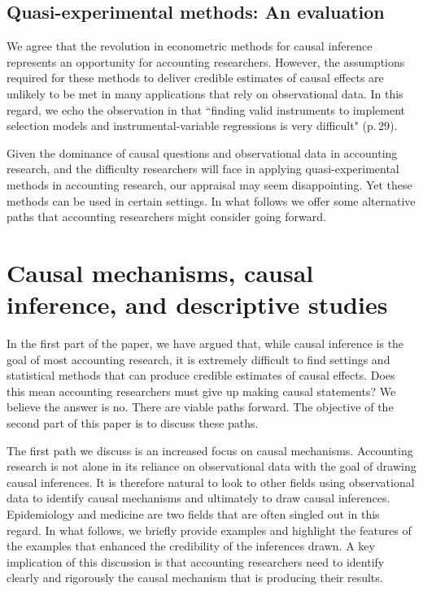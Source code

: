 \documentclass[12pt,reqno,titlepage]{amsart}
\theoremstyle{definition}
\begin{document}
\begin{doublespace}

\subsection{Quasi-experimental methods: An evaluation}
We agree that the revolution in econometric methods for causal inference represents an opportunity for accounting researchers.
However, the assumptions required for these methods to deliver credible estimates of causal effects are unlikely to be met in many applications that rely on observational data. 
In this regard, we echo the observation in \citet{Leuz:2015aa} that ``finding valid instruments to implement selection models and instrumental-variable regressions is very difficult" (p.\,29). 

Given the dominance of causal questions and observational data in accounting research, and the difficulty researchers will face in applying quasi-experimental methods in accounting research, our appraisal may seem disappointing. Yet these methods can be used in certain settings. In what follows we offer some alternative paths that accounting researchers might consider going forward.


\section{Causal mechanisms, causal inference, and descriptive studies} \label{sec:mech}

In the first part of the paper, we have argued that, while causal inference is the goal of most accounting research, it is extremely difficult to find settings and statistical methods that can produce credible estimates of causal effects. 
Does this mean accounting researchers must give up making causal statements? 
We believe the answer is no. There are viable paths forward. 
The objective of the second part of this paper is to discuss these paths. 

The first path we discuss is an increased focus on causal mechanisms. 
Accounting research is not alone in its reliance on observational data with the goal of drawing causal inferences. 
It is therefore natural to look to other fields using observational data to identify causal mechanisms and ultimately to draw causal inferences.
Epidemiology and medicine are two fields that are often singled out in this regard.
In what follows, we briefly provide examples and highlight the features of the examples that enhanced the credibility of the inferences drawn.
A key implication of this discussion is that accounting researchers need to identify clearly and rigorously the causal mechanism that is producing their results.


\end{doublespace}
\end{document}
